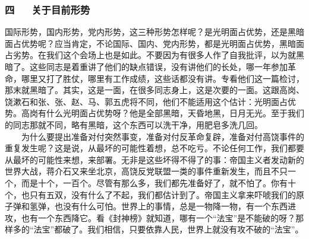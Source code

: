 \documentclass[cn,11pt,chinese]{elegantbook}
\def\myformat#1{\hfil\hfil #1}
\begin{document}
\subsubsection*{\myformat{四 　 关于目前形势}}
国际形势，国内形势，党内形势，这三种形势怎样呢？是光明面占优势，还是黑暗面占优势呢？应当肯定，不论国际、国内、党内形势，都是光明面占优势，黑暗面占劣势。在我们这个会场上也是如此。不要因为有很多人作了自我批评，以为就黑暗了。这些同志是着重讲了他们的缺点错误，没有讲他们的长处，哪一年参加革命，哪里又打了胜仗，哪里有工作成绩，这些话都没有讲。专看他们这一篇检讨，那末就黑暗了。其实，这是一面，在很多同志身上，这是次要的一面。这跟高岗、饶漱石和张、张、赵、马、郭五虎将不同，他们不能适用这个估计：光明面占优势。高岗有什么光明面占优势呀？他是全部黑暗，天昏地黑，日月无光。至于我们的同志那就不同，略有黑暗，这个东西可以洗干净，用肥皂多洗几回。\\
　　为什么要提出准备对付突然事变，准备对付反革命复辟，准备对付高饶事件的重复发生呢？这是说，从最坏的可能性着想，总不吃亏。不论任何工作，我们都要从最坏的可能性来想，来部署。无非是这些坏得不得了的事：帝国主义者发动新的世界大战，蒋介石又来坐北京，高饶反党联盟一类的事件重新发生，而且不只一个，而是十个，一百个。尽管有那么多，我们都先准备好了，就不怕了。你有十个，也只有五双，没有什么了不起，我们都估计到了。帝国主义拿来吓唬我们的原子弹和氢弹，也没有什么可怕。世界上的事情，总是一物降一物，有一个东西进攻，也有一个东西降它。看《封神榜》就知道，哪有一个“法宝”是不能破的呀？那样多的“法宝”都破了。我们相信，只要依靠人民，世界上就没有攻不破的“法宝”。\\
\end{document}
